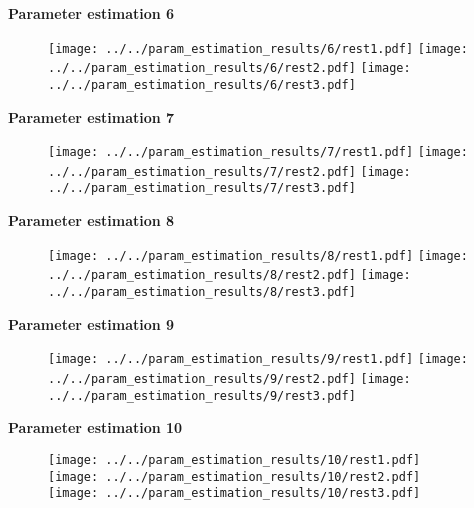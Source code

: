 \documentclass{article}
\begin{document}
\newpage

\hspace{1in} \bf{Parameter estimation 6}

\begin{figure}[!h]
  \texttt{[image: ../../param\_estimation\_results/6/rest1.pdf]}
  \texttt{[image: ../../param\_estimation\_results/6/rest2.pdf]}
  \texttt{[image: ../../param\_estimation\_results/6/rest3.pdf]}
\end{figure}

\newpage

\hspace{1in} \bf{Parameter estimation 7}

\begin{figure}[!h]
  \texttt{[image: ../../param\_estimation\_results/7/rest1.pdf]}
  \texttt{[image: ../../param\_estimation\_results/7/rest2.pdf]}
  \texttt{[image: ../../param\_estimation\_results/7/rest3.pdf]}
\end{figure}

\newpage

\hspace{1in} \bf{Parameter estimation 8}

\begin{figure}[!h]
  \texttt{[image: ../../param\_estimation\_results/8/rest1.pdf]}
  \texttt{[image: ../../param\_estimation\_results/8/rest2.pdf]}
  \texttt{[image: ../../param\_estimation\_results/8/rest3.pdf]}
\end{figure}

\newpage

\hspace{1in} \bf{Parameter estimation 9}

\begin{figure}[!h]
  \texttt{[image: ../../param\_estimation\_results/9/rest1.pdf]}
  \texttt{[image: ../../param\_estimation\_results/9/rest2.pdf]}
  \texttt{[image: ../../param\_estimation\_results/9/rest3.pdf]}
\end{figure}

\newpage

\hspace{1in} \bf{Parameter estimation 10}

\begin{figure}[!h]
  \texttt{[image: ../../param\_estimation\_results/10/rest1.pdf]}
  \texttt{[image: ../../param\_estimation\_results/10/rest2.pdf]}
  \texttt{[image: ../../param\_estimation\_results/10/rest3.pdf]}
\end{figure}
\end{document}
